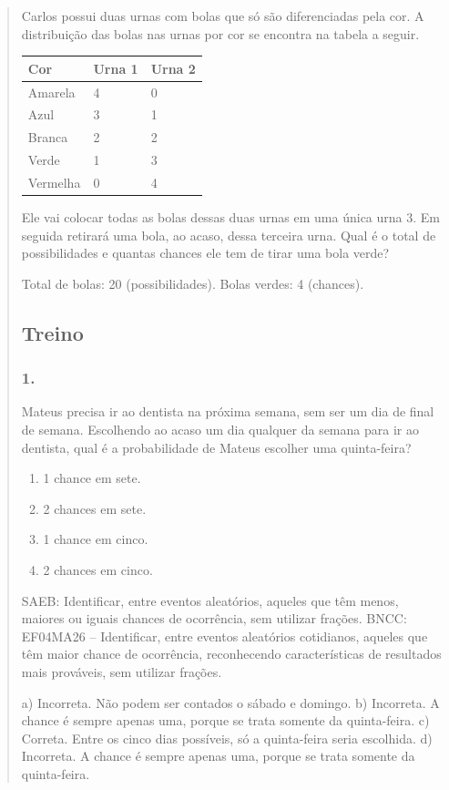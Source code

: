 \begin{enumerate}
\begin{escolha}
\begin{enumerate}
\begin{itemize}
\begin{itemize}
\begin{escolha}
\begin{quote}
\begin{escolha}
Carlos possui duas urnas com bolas que só são diferenciadas pela cor. A
distribuição das bolas nas urnas por cor se encontra na tabela a
seguir.

\begin{longtable}[]{@{}lll@{}}
\toprule
Cor & Urna 1 & Urna 2\tabularnewline
\midrule
\endhead
Amarela & 4 & 0\tabularnewline
Azul & 3 & 1\tabularnewline
Branca & 2 & 2\tabularnewline
Verde & 1 & 3\tabularnewline
Vermelha & 0 & 4\tabularnewline
\bottomrule
\end{longtable}

Ele vai colocar todas as bolas dessas duas urnas em uma única urna 3. Em
seguida retirará uma bola, ao acaso, dessa terceira urna. Qual é o total de possibilidades e quantas chances ele tem de tirar uma bola verde?

Total de bolas: 20 (possibilidades).
Bolas verdes: 4 (chances).


\subsection{Treino}\label{treino-6}

\subsubsection{1.}\label{section-88}

Mateus precisa ir ao dentista na próxima semana, sem ser um dia de final de semana. Escolhendo ao acaso um dia
qualquer da semana para ir ao dentista, qual é a probabilidade de Mateus
escolher uma quinta-feira?

\begin{enumerate}
\def\labelenumi{\alph{enumi})}
\item
  1 chance em sete.
\item
  2 chances em sete.
\item
  1 chance em cinco.
\item
  2 chances em cinco.
\end{enumerate}

SAEB: Identificar, entre eventos aleatórios, aqueles que têm menos, maiores ou iguais chances de ocorrência, sem utilizar frações.
BNCC: EF04MA26 -- Identificar, entre eventos aleatórios cotidianos, aqueles que têm maior chance de
ocorrência, reconhecendo características de resultados mais prováveis, sem utilizar frações.

a) Incorreta. Não podem ser contados o sábado e domingo.
b) Incorreta. A chance é sempre apenas uma, porque se trata somente da quinta-feira.
c) Correta. Entre os cinco dias possíveis, só a quinta-feira seria escolhida.
d) Incorreta. A chance é sempre apenas uma, porque se trata somente da quinta-feira.


\end{escolha}
\end{quote}
\end{escolha}
\end{itemize}
\end{itemize}
\end{enumerate}
\end{escolha}
\end{enumerate}

